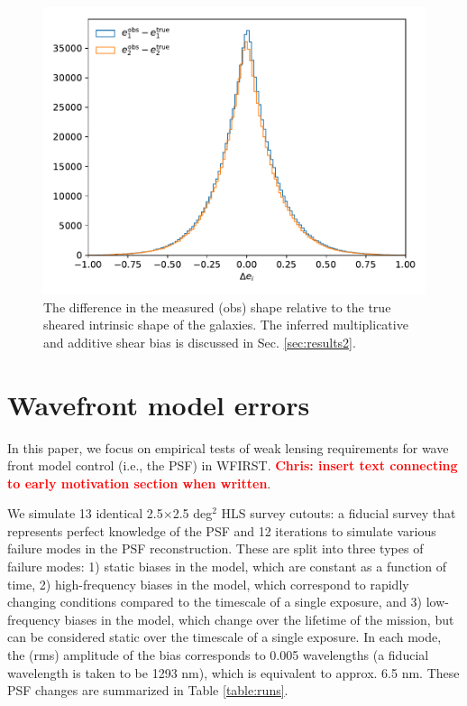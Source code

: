 \documentclass[aps,prd, amsmath,amssymb,superscriptaddress,showkeys,nofootinbib,reprint,preprintnumbers]{revtex4-1}
\newcommand{\verify}[1]{\textcolor{red}{\textbf{{#1}}}}
\begin{document}
\begin{figure}
\begin{center}
\includegraphics[width=\columnwidth]{figures/shape_hist.pdf}
\end{center}
\caption[]{
The difference in the measured (obs) shape relative to the true sheared intrinsic shape of the galaxies. The inferred multiplicative and additive shear bias is discussed in Sec. \ref{sec:results2}. 
\label{fig:shape_hist}}
\end{figure}

\section{Wavefront model errors}\label{sec:results}

In this paper, we focus on empirical tests of weak lensing requirements for wave front model control (i.e., the PSF) in WFIRST. \verify{Chris: insert text connecting to early motivation section when written}. 

We simulate 13 identical 2.5$\times$2.5 deg$^2$ HLS survey cutouts: a fiducial survey that represents perfect knowledge of the PSF and 12 iterations to simulate various failure modes in the PSF reconstruction. 
These are split into three types of failure modes: 1) static biases in the model, which are constant as a function of time, 2) high-frequency biases in the model, which correspond to rapidly changing conditions compared to the timescale of a single exposure, and 3) low-frequency biases in the model, which change over the lifetime of the mission, but can be considered static over the timescale of a single exposure. 
In each mode, the (rms) amplitude of the bias corresponds to 0.005 wavelengths (a fiducial wavelength is taken to be 1293 nm), which is equivalent to approx. 6.5 nm.  These PSF changes are summarized in Table \ref{table:runs}.
\end{document}

